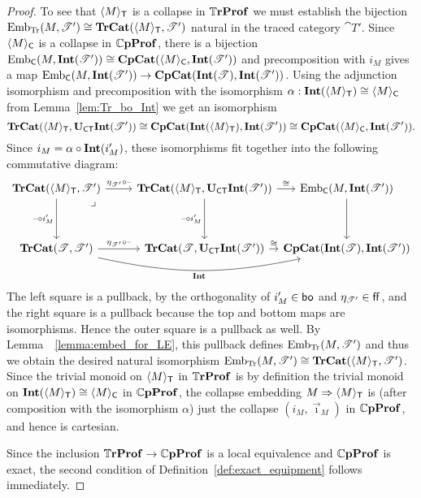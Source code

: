\documentclass[11pt,oneside,article]{memoir}
\begin{document}
\begin{proof}
   To see that $\langle M\rangle_{\mathsf{T}}$ is a collapse in $\mathbb{T}\mathbf{rProf}$ we must establish the bijection $\mathrm{Emb}_{\mathrm{Tr}}(M,\mathscr{T}')\cong\mathbf{TrCat}(\langle M\rangle_{\mathsf{T}},\mathscr{T}')$ natural in the traced category $\cat{T}'$.  Since $\langle M\rangle_{\mathsf{C}}$ is a collapse in $\mathbb{C}\mathbf{pProf}$, there is a bijection $\mathrm{Emb}_{\mathsf{C}}(M,\mathbf{Int}(\mathscr{T}'))\cong\mathbf{CpCat}(\langle M\rangle_{\mathsf{C}},\mathbf{Int}(\mathscr{T}'))$ and precomposition with $i_M$ gives a map $\mathrm{Emb}_{\mathsf{C}}(M,\mathbf{Int}(\mathscr{T}'))\to\mathbf{CpCat}(\mathbf{Int}(\mathscr{T}),\mathbf{Int}(\mathscr{T}'))$.  Using the adjunction isomorphism and precomposition with the isomorphism $\alpha:\mathbf{Int}(\langle M\rangle_{\mathsf{T}})\cong\langle M\rangle_{\mathsf{C}}$ from Lemma~\ref{lem:Tr_bo_Int} we get an isomorphism
   \[\mathbf{TrCat}(\langle M\rangle_{\mathsf{T}},\mathbf{U}_{\mathsf{CT}}\mathbf{Int}(\mathscr{T}'))\cong\mathbf{CpCat}(\mathbf{Int}(\langle M\rangle_{\mathsf{T}}),\mathbf{Int}(\mathscr{T}'))\cong\mathbf{CpCat}(\langle M\rangle_{\mathsf{C}},\mathbf{Int}(\mathscr{T}')).\]
   Since $i_M=\alpha\circ\mathbf{Int}(i'_M)$, these isomorphisms fit together into the following commutative diagram:
   \[ \begin{tikzcd}[column sep=between origins,row sep=between origins]
      \TrCat(\Col{M}_{\MTCfont{T}},\cat{T}')
            \ar[r,"\eta_{\cat{T}'}\circ\textrm{--}"]
            \ar[dd,"\textrm{--}\circ i'_M"']
            \ar[ddr,phantom,"\lrcorner" very near start]
         &[2.4em,between borders] \TrCat(\Col{M}_{\MTCfont{T}},\UCT\Int(\cat{T}'))
            \ar[dd,"\textrm{--}\circ i'_M"']
            \ar[rr,"\iso"]
         &[6.4em]
         &[6.4em] \Emb_{\MTCfont{C}}(M,\Int(\cat{T}')) \ar[dd] \\[2em]\\[3.4em]
      \TrCat(\cat{T},\cat{T}')
            \ar[r,"\eta_{\cat{T}'}\circ\textrm{--}"]
            \ar[rrr,bend right=12,"\Int"']
         & \TrCat(\cat{T},\UCT\Int(\cat{T}'))
            \ar[rr,"\iso"]
         && \CompCat(\Int(\cat{T}),\Int(\cat{T}'))
   \end{tikzcd} \]
   The left square is a pullback, by the orthogonality of $i'_M\in\mathsf{bo}$ and $\eta_{\mathscr{T}'}\in\mathsf{ff}$, and the
   right square is a pullback because the top and bottom maps are isomorphisms.  Hence the outer square is a pullback as well.  By Lemma~~\ref{lemma:embed_for_LE}, this pullback defines $\mathrm{Emb}_{\mathrm{Tr}}(M,\mathscr{T}')$ and thus we obtain the desired natural isomorphism $\mathrm{Emb}_{\mathrm{Tr}}(M,\mathscr{T}')\cong\mathbf{TrCat}(\langle M\rangle_{\mathsf{T}},\mathscr{T}')$.  Since the trivial monoid on $\langle M\rangle_{\mathsf{T}}$ in $\mathbb{T}\mathbf{rProf}$ is by definition the trivial monoid on $\mathbf{Int}(\langle M\rangle_{\mathsf{T}})\cong\langle M\rangle_{\mathsf{C}}$ in $\mathbb{C}\mathbf{pProf}$, the collapse embedding $M\Rightarrow\langle M\rangle_{\mathsf{T}}$ is (after composition with the isomorphism $\alpha$) just the collapse $(i_M,\vec{\imath}_M)$ in $\mathbb{C}\mathbf{pProf}$, and hence is cartesian.

   Since the inclusion $\mathbb{T}\mathbf{rProf}\to\mathbb{C}\mathbf{pProf}$ is a local equivalence and $\mathbb{C}\mathbf{pProf}$ is exact, the second condition of Definition~\ref{def:exact_equipment} follows immediately.
\end{proof}
\end{document}
